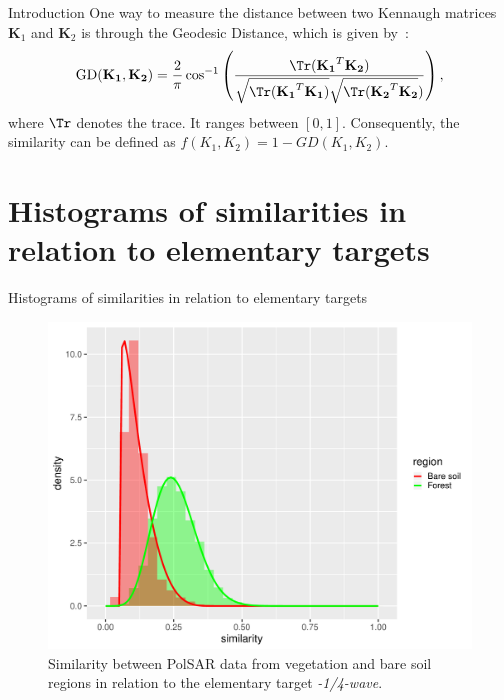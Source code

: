 \documentclass[10pt]{beamer}
\begin{document}
\begin{frame}[fragile]{Introduction}
    One way to measure the distance between two Kennaugh matrices $\bm K_1$ and $\bm K_2$ is through the Geodesic Distance, which is given by~\cite{ClassificationPolSARGeodesic}: 
    \begin{displaymath}
    \text{GD}(\mathbf{K_1}, \mathbf{K_2}) = \frac{2}{\pi} \cos^{-1} \left(\frac{\Tr(\mathbf{K_1}^T \mathbf{K_2})}{\sqrt{\Tr(\mathbf{K_1}^T \mathbf{K_1})} \sqrt{\Tr(\mathbf{K_2}^T \mathbf{K_2}})} \right),
    \end{displaymath}
    where $\Tr$ denotes the trace. It ranges between $[0,1]$. Consequently, the similarity can be defined as $f(K_1, K_2) = 1 - GD(K_1, K_2)$.
\end{frame}

\section[Histograms]{Histograms of similarities in relation to elementary targets}

\begin{frame}[fragile]{Histograms of similarities in relation to elementary targets}

\begin{figure}
    \centering
    \includegraphics[width = .6\linewidth]{wvn.pdf}
    \caption{Similarity between PolSAR data from vegetation and bare soil regions in relation to the elementary target \textit{-1/4-wave}.}
    \label{fig:wvn}
\end{figure}
    
\end{frame}
\end{document}
